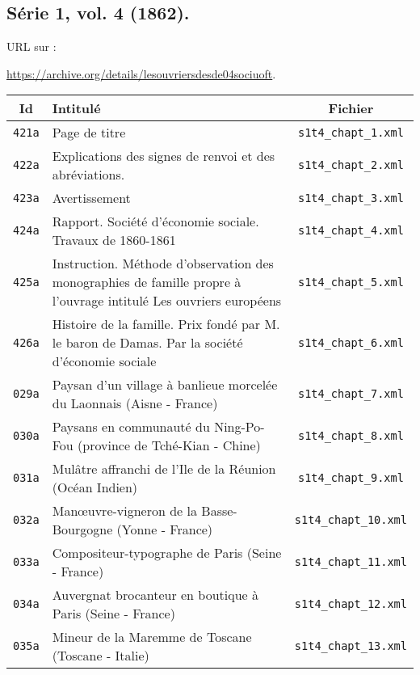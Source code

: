 \subsection{Série 1, vol. 4 (1862).}
\label{mappings1t4}

URL sur \ia{} : 

\url{https://archive.org/details/lesouvriersdesde04sociuoft}.

\begin{center}
\begin{longtable}{ | c | p{9.5cm} | c | }
\hline
Id & Intitulé & Fichier \\ \hline
\texttt{421a} & Page de titre & \texttt{s1t4\_chapt\_1.xml} \\ \hline
\texttt{422a} & Explications des signes de renvoi et des abréviations. & \texttt{s1t4\_chapt\_2.xml} \\ \hline
\texttt{423a} & Avertissement & \texttt{s1t4\_chapt\_3.xml} \\ \hline
\texttt{424a} & Rapport. Société d'économie sociale. Travaux de 1860-1861 & \texttt{s1t4\_chapt\_4.xml} \\ \hline
\texttt{425a} & Instruction. Méthode d'observation des monographies de famille propre à l'ouvrage intitulé Les ouvriers européens & \texttt{s1t4\_chapt\_5.xml} \\ \hline
\texttt{426a} & Histoire de la famille. Prix fondé par M. le baron de Damas. Par la société d'économie sociale & \texttt{s1t4\_chapt\_6.xml} \\ \hline
\texttt{029a} & Paysan d'un village à banlieue morcelée du Laonnais (Aisne - France) & \texttt{s1t4\_chapt\_7.xml} \\ \hline
\texttt{030a} & Paysans en communauté du Ning-Po-Fou (province de Tché-Kian - Chine) & \texttt{s1t4\_chapt\_8.xml} \\ \hline
\texttt{031a} & Mulâtre affranchi de l'Ile de la Réunion (Océan Indien) & \texttt{s1t4\_chapt\_9.xml} \\ \hline
\texttt{032a} & Manœuvre-vigneron de la Basse-Bourgogne (Yonne - France) & \texttt{s1t4\_chapt\_10.xml} \\ \hline
\texttt{033a} & Compositeur-typographe de Paris (Seine - France) & \texttt{s1t4\_chapt\_11.xml} \\ \hline
\texttt{034a} & Auvergnat brocanteur en boutique à Paris (Seine - France) & \texttt{s1t4\_chapt\_12.xml} \\ \hline
\texttt{035a} & Mineur de la Maremme de Toscane (Toscane - Italie) & \texttt{s1t4\_chapt\_13.xml} \\ \hline

\end{longtable}
\end{center}
